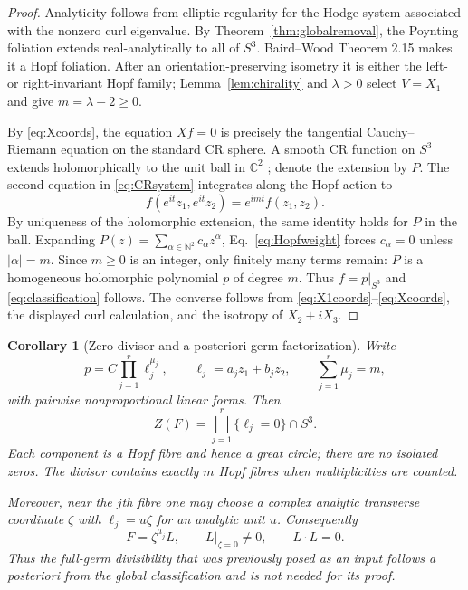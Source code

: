 \documentclass[aps,prd,reprint,nofootinbib,superscriptaddress]{revtex4-2}
\newtheorem{corollary}[theorem]{Corollary}
\theoremstyle{definition}
\theoremstyle{remark}
\newcommand{\C}{\mathbb{C}}
\begin{document}
\begin{proof}
Analyticity follows from elliptic regularity for the Hodge system associated with the nonzero curl eigenvalue. By Theorem~\ref{thm:globalremoval}, the Poynting foliation extends real-analytically to all of $S^3$. Baird--Wood Theorem 2.15 makes it a Hopf foliation. After an orientation-preserving isometry it is either the left- or right-invariant Hopf family; Lemma~\ref{lem:chirality} and $\lambda>0$ select $V=X_1$ and give $m=\lambda-2\ge0$.

By \eqref{eq:Xcoords}, the equation $Xf=0$ is precisely the tangential Cauchy--Riemann equation on the standard CR sphere.  A smooth CR function on $S^3$ extends holomorphically to the unit ball in $\C^2$ \cite{Rudin1980}; denote the extension by $P$.  The second equation in \eqref{eq:CRsystem} integrates along the Hopf action to
\begin{equation}
f(e^{it}z_1,e^{it}z_2)=e^{imt}f(z_1,z_2).
\label{eq:Hopfweight}
\end{equation}
By uniqueness of the holomorphic extension, the same identity holds for $P$ in the ball.  Expanding $P(z)=\sum_{\alpha\in\mathbb N^2}c_\alpha z^\alpha$, Eq.~\eqref{eq:Hopfweight} forces $c_\alpha=0$ unless $|\alpha|=m$.  Since $m\ge0$ is an integer, only finitely many terms remain: $P$ is a homogeneous holomorphic polynomial $p$ of degree $m$.  Thus $f=p|_{S^3}$ and \eqref{eq:classification} follows. The converse follows from \eqref{eq:X1coords}--\eqref{eq:Xcoords}, the displayed curl calculation, and the isotropy of $X_2+iX_3$.
\end{proof}

\begin{corollary}[Zero divisor and a posteriori germ factorization]
\label{cor:zeros}
Write
\[
p=C\prod_{j=1}^{r}\ell_j^{\mu_j},
\qquad
\ell_j=a_jz_1+b_jz_2,
\qquad
\sum_{j=1}^{r}\mu_j=m,
\]
with pairwise nonproportional linear forms. Then
\begin{equation}
Z(F)=\bigsqcup_{j=1}^{r}\bigl\{\ell_j=0\bigr\}\cap S^3.
\label{eq:zerohopf}
\end{equation}
Each component is a Hopf fibre and hence a great circle; there are no isolated zeros. The divisor contains exactly $m$ Hopf fibres when multiplicities are counted.

Moreover, near the $j$th fibre one may choose a complex analytic transverse coordinate $\zeta$ with $\ell_j=u\zeta$ for an analytic unit $u$. Consequently
\begin{equation}
F=\zeta^{\mu_j}L,
\qquad L|_{\zeta=0}\ne0,
\qquad L\cdot L=0.
\label{eq:posteriorfactor}
\end{equation}
Thus the full-germ divisibility that was previously posed as an input follows a posteriori from the global classification and is not needed for its proof.
\end{corollary}
\end{document}
